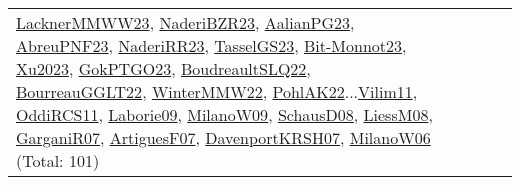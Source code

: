 {\begin{longtable}{p{3cm}r>{\raggedright\arraybackslash}p{6cm}>{\raggedright\arraybackslash}p{6cm}>{\raggedright\arraybackslash}p{8cm}}
\hyperref[detail:LacknerMMWW23]{LacknerMMWW23}, \hyperref[detail:NaderiBZR23]{NaderiBZR23}, \hyperref[detail:AalianPG23]{AalianPG23}, \hyperref[detail:AbreuPNF23]{AbreuPNF23}, \hyperref[detail:NaderiRR23]{NaderiRR23}, \hyperref[detail:TasselGS23]{TasselGS23}, \hyperref[detail:Bit-Monnot23]{Bit-Monnot23}, \hyperref[detail:Xu2023]{Xu2023}, \hyperref[detail:GokPTGO23]{GokPTGO23}, \hyperref[detail:BoudreaultSLQ22]{BoudreaultSLQ22}, \hyperref[detail:BourreauGGLT22]{BourreauGGLT22}, \hyperref[detail:WinterMMW22]{WinterMMW22}, \hyperref[detail:PohlAK22]{PohlAK22}...\hyperref[detail:Vilim11]{Vilim11}, \hyperref[detail:OddiRCS11]{OddiRCS11}, \hyperref[detail:Laborie09]{Laborie09}, \hyperref[detail:MilanoW09]{MilanoW09}, \hyperref[detail:SchausD08]{SchausD08}, \hyperref[detail:LiessM08]{LiessM08}, \hyperref[detail:GarganiR07]{GarganiR07}, \hyperref[detail:ArtiguesF07]{ArtiguesF07}, \hyperref[detail:DavenportKRSH07]{DavenportKRSH07}, \hyperref[detail:MilanoW06]{MilanoW06} (Total: 101)\\

\end{longtable}}
